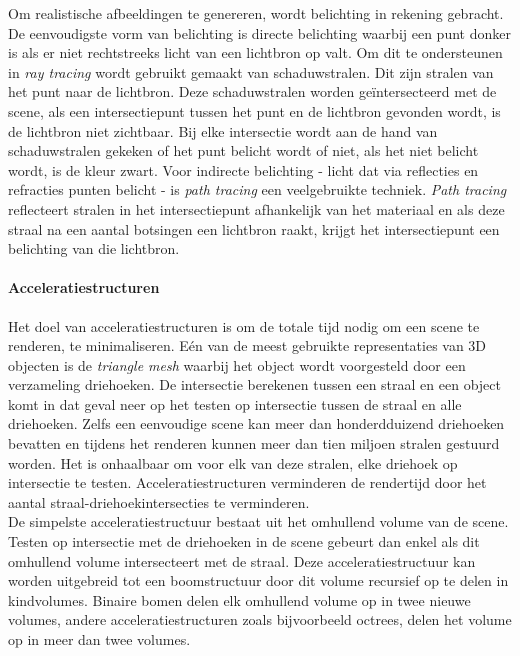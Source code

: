 Om realistische afbeeldingen te genereren, wordt belichting in rekening gebracht. De eenvoudigste vorm van belichting is directe belichting waarbij een punt donker is als er niet rechtstreeks licht van een lichtbron op valt. Om dit te ondersteunen in \textit{ray tracing} wordt gebruikt gemaakt van schaduwstralen. Dit zijn stralen van het punt naar de lichtbron. Deze schaduwstralen worden geïntersecteerd met de scene, als een intersectiepunt tussen het punt en de lichtbron gevonden wordt, is de lichtbron niet zichtbaar. Bij elke intersectie wordt aan de hand van schaduwstralen gekeken of het punt belicht wordt of niet, als het niet belicht wordt, is de kleur zwart. Voor indirecte belichting - licht dat via reflecties en refracties punten belicht - is \textit{path tracing} \cite{kajiya1986rendering} een veelgebruikte techniek. \textit{Path tracing} reflecteert stralen in het intersectiepunt afhankelijk van het materiaal en als deze straal na een aantal botsingen een lichtbron raakt, krijgt het intersectiepunt een belichting van die lichtbron.    



\paragraph{Acceleratiestructuren}
Het doel van acceleratiestructuren is om de totale tijd nodig om een scene te renderen, te minimaliseren.
Eén van de meest gebruikte representaties van 3D objecten is de \textit{triangle mesh} waarbij het object wordt voorgesteld door een verzameling driehoeken.
De intersectie berekenen tussen een straal en een object komt in dat geval neer op het testen op intersectie tussen de straal en alle driehoeken.
Zelfs een eenvoudige scene kan meer dan honderdduizend driehoeken bevatten en tijdens het renderen kunnen meer dan tien miljoen stralen gestuurd worden.
Het is onhaalbaar om voor elk van deze stralen, elke driehoek op intersectie te testen.
Acceleratiestructuren verminderen de rendertijd door het aantal straal-driehoekintersecties te verminderen.\\

De simpelste acceleratiestructuur bestaat uit het omhullend volume van de scene.
Testen op intersectie met de driehoeken in de scene gebeurt dan enkel als dit omhullend volume intersecteert met de straal.
Deze acceleratiestructuur kan worden uitgebreid tot een boomstructuur door dit volume recursief op te delen in kindvolumes.
Binaire bomen delen elk omhullend volume op in twee nieuwe volumes, andere acceleratiestructuren zoals bijvoorbeeld octrees, delen het volume op in meer dan twee volumes.
\\

